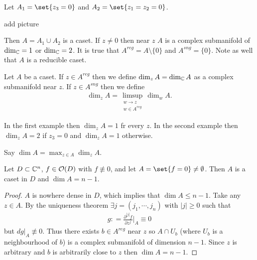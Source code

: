 \begin{example}
    Let $A_1 = \set{z_3 = 0} $ and $A_2 = \set{z_1 = z_2 = 0}$.

    add picture

    Then $A = A_1 \cup A_2$ is a caset. If $z \neq 0$ then near $z$ $A$ is a complex submanifold of $\dim_{\mathbb{C}} =1$ or $\dim_{\mathbb{C}} = 2$. It is true that $A^{reg} = A \setminus \{0 \}$ and $A^{sng} = \{ 0 \}$. Note as well that $A$ is a reducible caset.
\end{example}

\begin{definition}
    Let $A$ be a caset. If $z \in A^{reg}$ then we define $\dim_z A = \dim_{\mathbb{C}} A$ as a complex submanifold near $z$. If $z \in A^{sng}$ then we define
    \begin{align*}
        \dim_z A = \limsup_{\substack{w \to z\\ w \in A^{reg}}} \dim_w A.
    \end{align*}
\end{definition}

\begin{example}
    In the first example then $\dim_z A = 1$ fr every $z$. In the second example then $\dim_z A = 2$ if $z_3 = 0$ and $\dim_zA = 1$ otherwise. 
\end{example}

\begin{definition}
    Say $\dim A = \max_{z \in A} \dim_zA$.
\end{definition}

\begin{proposition}
    Let $D \subset \mathbb{C}^n$, $f \in \mathcal{O}(D)$ with $f \not\equiv 0$, and let $A = \set{f=0 } \neq \emptyset$. Then $A$ is a caset in $D$ and $\dim A = n-1$.
\end{proposition}

\begin{proof}
    $A $ is nowhere dense in $D$, which implies that $\dim A \leq n-1$. Take any $z \in A$. By the uniqueness theorem $\exists j = (j_1, \cdots, j_n)$ with $|j| \geq 0$ such that
    \begin{align*}
        g : = \frac{\partial^{|j|} f}{\partial z^j} \bigg|_A \equiv 0
    \end{align*}
    but $dg |_A \not\equiv 0$. Thus there exists $b \in A^{reg}$ near $z$ so $A \cap U_b$ (where $U_b$ is a neighbourhood of $b$) is a complex submanifold of dimension $n-1$. Since $z$ is arbitrary and $b$ is arbitrarily close to $z$ then $\dim A = n-1$.
\end{proof}

